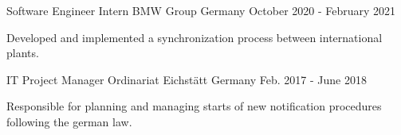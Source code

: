 
\begin{cventries}
  \cventry
    {Software Engineer Intern} %
    {BMW Group} %
    {Germany} %
    {October 2020 - February 2021} %
    {
      \begin{cvitems} %
        \item {Developed and implemented a synchronization process between international plants.}
      \end{cvitems}
    }

  \cventry
    {IT Project Manager} %
    {Ordinariat Eichstätt} %
    {Germany} %
    {Feb. 2017 - June 2018} %
    {
      \begin{cvitems} %
        \item {Responsible for planning and managing starts of new notification procedures following the german law.}
      \end{cvitems}
    }    
\end{cventries}